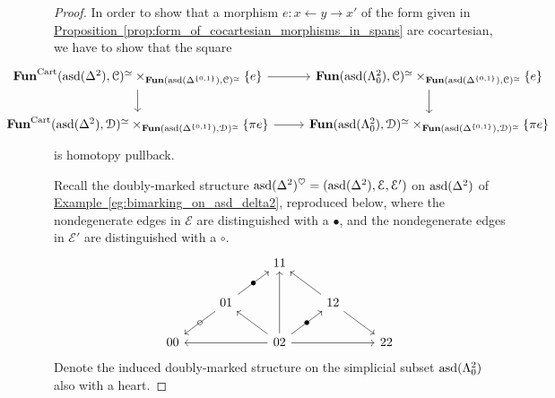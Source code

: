 \documentclass[main.tex]{subfiles}
\begin{document}
\begin{proof}
  In order to show that a morphism $e\colon x \leftarrow y \rightarrow x'$ of the form given in \hyperref[prop:form_of_cocartesian_morphisms_in_spans]{Proposition~\ref*{prop:form_of_cocartesian_morphisms_in_spans}} are cocartesian, we have to show that
  the square
  \begin{equation*}
    \noindent\makebox[\textwidth]{%
      \begin{tikzcd}[ampersand replacement=\&]
        \Fun^{\Cart}(\asd(\Delta^{2}), \category{C})^{\simeq} \times_{\Fun(\asd(\Delta^{\{0, 1\}}), \category{C})^{\simeq}} \{e\}
        \arrow[r]
        \arrow[d]
        \& \Fun(\asd(\Lambda^{2}_{0}), \category{C})^{\simeq} \times_{\Fun(\asd(\Delta^{\{0, 1\}}), \category{C})^{\simeq}} \{e\}
        \arrow[d]
        \\
        \Fun^{\Cart}(\asd(\Delta^{2}), \category{D})^{\simeq} \times_{\Fun(\asd(\Delta^{\{0, 1\}}), \category{D})^{\simeq}} \{\pi e\}
        \arrow[r]
        \& \Fun(\asd(\Lambda^{2}_{0}), \category{D})^{\simeq} \times_{\Fun(\asd(\Delta^{\{0, 1\}}), \category{D})^{\simeq}} \{\pi e\}
      \end{tikzcd}
    }
  \end{equation*}
  is homotopy pullback.

  Recall the doubly-marked structure $\mathrm{asd}(\Delta^{2})^{\heartsuit} = (\mathrm{asd}(\Delta^{2}), \mathcal{E}, \mathcal{E}')$ on $\mathrm{asd}(\Delta^{2})$ of \hyperref[eg:bimarking_on_asd_delta2]{Example~\ref*{eg:bimarking_on_asd_delta2}}, reproduced below, where the nondegenerate edges in $\mathcal{E}$ are distinguished with a $\bullet$, and the nondegenerate edges in $\mathcal{E}'$ are distinguished with a $\circ$.
  \begin{equation*}
    \begin{tikzcd}
      && 11
      \\
      & 01
      \arrow[ur, "\bullet" marking]
      \arrow[dl, "\circ" marking]
      && 12
      \arrow[ul]
      \arrow[dr]
      \\
      00
      && 02
      \arrow[ll]
      \arrow[rr]
      \arrow[uu]
      \arrow[ur, "\bullet" marking]
      \arrow[ul]
      && 22
    \end{tikzcd}
  \end{equation*}
  Denote the induced doubly-marked structure on the simplicial subset $\mathrm{asd}(\Lambda^{2}_{0})$ also with a heart.


\end{proof}
\end{document}
